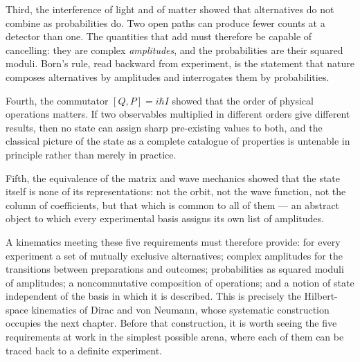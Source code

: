 Third, the interference of light and of matter showed that alternatives do not combine as probabilities do. Two open paths can produce fewer counts at a detector than one. The quantities that add must therefore be capable of cancelling: they are complex \emph{amplitudes}, and the probabilities are their squared moduli. Born's rule, read backward from experiment, is the statement that nature composes alternatives by amplitudes and interrogates them by probabilities.

Fourth, the commutator $[Q,P]=i\hbar I$ showed that the order of physical operations matters. If two observables multiplied in different orders give different results, then no state can assign sharp pre-existing values to both, and the classical picture of the state as a complete catalogue of properties is untenable in principle rather than merely in practice.

Fifth, the equivalence of the matrix and wave mechanics showed that the state itself is none of its representations: not the orbit, not the wave function, not the column of coefficients, but that which is common to all of them --- an abstract object to which every experimental basis assigns its own list of amplitudes.

A kinematics meeting these five requirements must therefore provide: for every experiment a set of mutually exclusive alternatives; complex amplitudes for the transitions between preparations and outcomes; probabilities as squared moduli of amplitudes; a noncommutative composition of operations; and a notion of state independent of the basis in which it is described. This is precisely the Hilbert-space kinematics of Dirac and von Neumann, whose systematic construction occupies the next chapter. Before that construction, it is worth seeing the five requirements at work in the simplest possible arena, where each of them can be traced back to a definite experiment.

